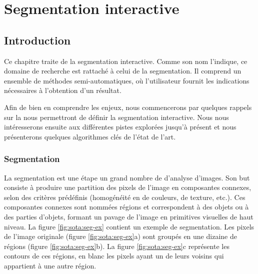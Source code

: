 \chapter{Segmentation interactive }

\section{Introduction}

Ce chapitre traite de la segmentation interactive. Comme son nom l'indique, ce domaine de recherche est rattaché à celui de la segmentation. Il comprend un ensemble de méthodes semi-automatiques, où l'utilisateur fournit les indications nécessaires à l'obtention d'un résultat. 

Afin de bien en comprendre les enjeux, nous commencerons par quelques rappels sur la  nous permettront de définir la segmentation interactive. Nous nous intéresserons ensuite aux différentes pistes explorées jusqu'à présent et nous présenterons quelques algorithmes clés de l'état de l'art. 


\subsection{Segmentation}

La segmentation est une étape  un grand nombre de  d'analyse d'images. Son but consiste à produire une partition des pixels de l'image en composantes connexes, selon des critères prédéfinis (homogénéité en  de couleurs, de texture, etc.). Ces composantes connexes sont nommées régions et correspondent à des objets ou à des parties d'objets, formant un pavage de l'image en primitives visuelles de haut niveau. La figure \ref{fig:sota:seg-ex} contient un exemple de segmentation. Les pixels de l'image originale (figure \ref{fig:sota:seg-ex}a) sont groupés en une dizaine de régions (figure \ref{fig:sota:seg-ex}b). La figure \ref{fig:sota:seg-ex}c représente les contours de ces régions,  en blanc les pixels ayant un de leurs voisins qui appartient à une autre région.

